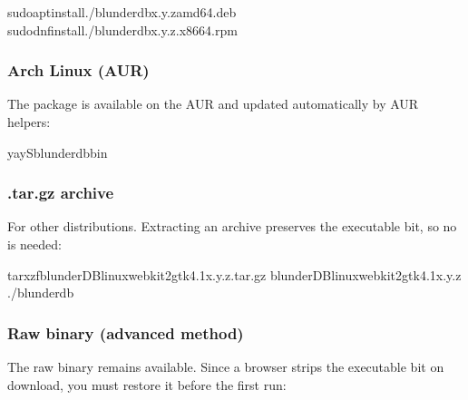 \documentclass[letterpaper,10pt,english]{sphinxmanual}
\begin{document}
\begin{sphinxVerbatim}[commandchars=\\\{\}]
sudoaptinstall./blunderdb\PYGZus{}x.y.z\PYGZus{}amd64.deb
sudodnfinstall./blunderdb\PYGZhy{}x.y.z.x86\PYGZus{}64.rpm
\end{sphinxVerbatim}


\subsubsection{Arch Linux (AUR)}
\label{\detokenize{telecharge_install:arch-linux-aur}}
\sphinxAtStartPar
The  package is available on the AUR and updated automatically by AUR helpers:

\begin{sphinxVerbatim}[commandchars=\\\{\}]
yay\PYGZhy{}Sblunderdb\PYGZhy{}bin
\end{sphinxVerbatim}


\subsubsection{.tar.gz archive}
\label{\detokenize{telecharge_install:archive-tar-gz}}
\sphinxAtStartPar
For other distributions. Extracting an archive preserves the executable bit, so no  is needed:

\begin{sphinxVerbatim}[commandchars=\\\{\}]
tarxzfblunderDB\PYGZhy{}linux\PYGZhy{}webkit2gtk\PYGZhy{}4.1\PYGZhy{}x.y.z.tar.gz
blunderDB\PYGZhy{}linux\PYGZhy{}webkit2gtk\PYGZhy{}4.1\PYGZhy{}x.y.z
./blunderdb
\end{sphinxVerbatim}


\subsubsection{Raw binary (advanced method)}
\label{\detokenize{telecharge_install:binaire-brut-methode-avancee}}
\sphinxAtStartPar
The raw binary  remains available. Since a browser strips the executable bit on download, you must restore it before the first run:
\end{document}
